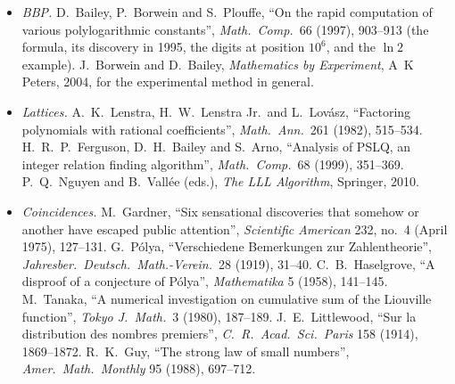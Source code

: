 \begin{itemize}
\item \emph{BBP.} D.~Bailey, P.~Borwein and S.~Plouffe, ``On the rapid computation of various polylogarithmic constants'', \emph{Math.\ Comp.}\ 66 (1997), 903--913 (the formula, its discovery
in 1995, the digits at position $10^6$, and the $\ln2$ example). J.~Borwein and D.~Bailey, \emph{Mathematics by Experiment}, A~K Peters, 2004, for the experimental method in general.
\item \emph{Lattices.} A.~K.~Lenstra, H.~W.~Lenstra Jr.\ and L.~Lov\'asz, ``Factoring polynomials with rational coefficients'', \emph{Math.\ Ann.}\ 261 (1982), 515--534. H.~R.~P.~Ferguson, D.~H.~Bailey
and S.~Arno, ``Analysis of PSLQ, an integer relation finding algorithm'', \emph{Math.\ Comp.}\ 68 (1999), 351--369. P.~Q.~Nguyen and B.~Vall\'ee (eds.), \emph{The LLL Algorithm}, Springer, 2010.
\item \emph{Coincidences.} M.~Gardner, ``Six sensational discoveries that somehow or another have escaped public attention'', \emph{Scientific American} 232, no.~4 (April 1975), 127--131.
G.~P\'olya, ``Verschiedene Bemerkungen zur Zahlentheorie'', \emph{Jahresber.\ Deutsch.\ Math.-Verein.}\ 28 (1919), 31--40. C.~B.~Haselgrove, ``A disproof of a conjecture of P\'olya'', \emph{Mathematika} 5 (1958),
141--145. M.~Tanaka, ``A numerical investigation on cumulative sum of the Liouville function'', \emph{Tokyo J.\ Math.}\ 3 (1980), 187--189. J.~E.~Littlewood, ``Sur la distribution des nombres premiers'',
\emph{C.\ R.\ Acad.\ Sci.\ Paris} 158 (1914), 1869--1872. R.~K.~Guy, ``The strong law of small numbers'', \emph{Amer.\ Math.\ Monthly} 95 (1988), 697--712.
\end{itemize}
